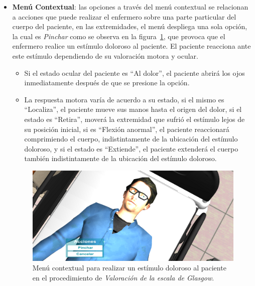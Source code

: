 \begin{itemize}

\item{\textbf{Menú Contextual}:} las opciones a través del menú contextual se
    relacionan a acciones que puede realizar el enfermero sobre una parte
    particular del cuerpo del paciente, en las extremidades, el menú despliega
    una sola opción, la cual es \emph{Pinchar} como se observa en la
    figura~\ref{fig:glasgow_menu_accion}, que provoca que el enfermero realice
    un estímulo doloroso al paciente. El paciente reacciona ante este estímulo
    dependiendo de su valoración motora y ocular. 

    \begin{itemize}
    \item Si el estado ocular del paciente es \enquote{Al dolor}, el paciente
        abrirá los ojos inmediatamente después de que se presione la opción. 
    \item  La respuesta motora varía de acuerdo a su estado, si el mismo es
        \enquote{Localiza}, el paciente mueve sus manos hasta el origen del
        dolor, si el estado es \enquote{Retira}, moverá la extremidad que
        sufrió el estímulo lejos de su posición inicial, si es
        \enquote{Flexión anormal}, el paciente reaccionará comprimiendo el
        cuerpo, indistintamente de la ubicación del estímulo doloroso, y si el
        estado es \enquote{Extiende}, el paciente extenderá el cuerpo también 
        indistintamente de la ubicación del estímulo doloroso.
    \end{itemize}

\begin{figure}[hbt]
\centering
\includegraphics[scale=0.5]{solucion/images/glasgow_menu_accion.png}
\caption{Menú contextual para realizar un estímulo doloroso al paciente en el procedimiento de 
\emph{Valoración de la escala de Glasgow}.}
\label{fig:glasgow_menu_accion}
\end{figure}


\end{itemize}
